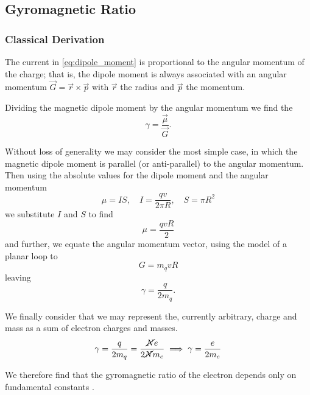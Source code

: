 \subsection{Gyromagnetic Ratio}
\subsubsection{Classical Derivation}
The current in \eqref{eq:dipole_moment} is proportional to the angular momentum of the charge; that is, the dipole moment is always associated with an angular momentum $\vec{G} = \vec{r} \times \vec{p}$ with $\vec{r}$ the radius and $\vec{p}$ the momentum. 

Dividing the magnetic dipole moment by the angular momentum we find the \textbf{} \cite{} 
\begin{equation}
    \gamma = \frac{\vec{\mu}}{\vec{G}}.
    \label{eq:gyromagnetic_ratio}
\end{equation}

Without loss of generality we may consider the most simple case, in which the magnetic dipole moment is parallel (or anti-parallel) to the angular momentum. Then using the absolute values for the dipole moment and the angular momentum 
\begin{equation}
    \mu = IS, \quad I = 
    \frac{qv}{2\pi R},
    \quad S = \pi R^2 
\end{equation}
we substitute $I$ and $S$ to find 
\begin{equation}
    \mu = \frac{qvR}{2}
\end{equation}
and further, we equate the angular momentum vector, using the model of a planar loop to 
\begin{equation}
   G= m_q v R 
\end{equation}
leaving 
\begin{equation}
    \gamma = \frac{q}{2m_q } . 
\end{equation}

We finally consider that we may represent the, currently arbitrary, charge and mass as a sum of electron charges and masses. 
\begin{equation}
    \gamma = \frac{q}{2m_q } = \frac{\cancel{N}e}{2\cancel{N} m_e} \implies \gamma = \frac{e}{2 m_e}
    \label{eq:gyromagnetic_ratio_electrons}
\end{equation}

We therefore find that the gyromagnetic ratio of the electron depends only on fundamental constants \cite{bromley2000quantum}.



